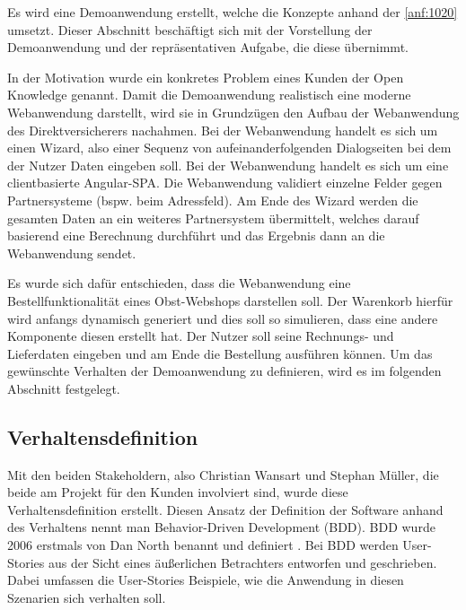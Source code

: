 
Es wird eine Demoanwendung erstellt, welche die Konzepte anhand der \autoref{anf:1020} umsetzt. Dieser Abschnitt beschäftigt sich mit der Vorstellung der Demoanwendung und der repräsentativen Aufgabe, die diese übernimmt.

In der Motivation wurde ein konkretes Problem eines Kunden der Open Knowledge genannt. Damit die Demoanwendung realistisch eine moderne Webanwendung darstellt, wird sie in Grundzügen den Aufbau der Webanwendung des Direktversicherers nachahmen. Bei der Webanwendung handelt es sich um einen Wizard, also einer Sequenz von aufeinanderfolgenden Dialogseiten bei dem der Nutzer Daten eingeben soll. Bei der Webanwendung handelt es sich um eine clientbasierte Angular-SPA. Die Webanwendung validiert einzelne Felder gegen Partnersysteme (bspw. beim Adressfeld). Am Ende des Wizard werden die gesamten Daten an ein weiteres Partnersystem übermittelt, welches darauf basierend eine Berechnung durchführt und das Ergebnis dann an die Webanwendung sendet.

Es wurde sich dafür entschieden, dass die Webanwendung eine Bestellfunktionalität eines Obst-Webshops darstellen soll. Der Warenkorb hierfür wird anfangs dynamisch generiert und dies soll so simulieren, dass eine andere Komponente diesen erstellt hat. Der Nutzer soll seine Rechnungs- und Lieferdaten eingeben und am Ende die Bestellung ausführen können. Um das gewünschte Verhalten der Demoanwendung zu definieren, wird es im folgenden Abschnitt festgelegt.

\subsection{Verhaltensdefinition}

Mit den beiden Stakeholdern, also Christian Wansart und Stephan Müller, die beide am Projekt für den Kunden involviert sind, wurde diese Verhaltensdefinition erstellt. Diesen Ansatz der Definition der Software anhand des Verhaltens nennt man Behavior-Driven Development (BDD). BDD wurde 2006 erstmals von Dan North benannt und definiert \cite{IntroducingBDD}. Bei BDD werden User-Stories aus der Sicht eines äußerlichen Betrachters entworfen und geschrieben. Dabei umfassen die User-Stories Beispiele, wie die Anwendung in diesen Szenarien sich verhalten soll.


